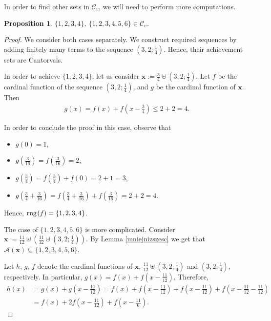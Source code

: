 \documentclass{amsart}
\newtheorem{proposition}[theorem]{Proposition}
\theoremstyle{definition}
\newcommand{\rng}{{\rm rng} \hspace{0.03cm}}
\newcommand{\Cv}{\mathcal{C}_{v}}
\newcommand{\GN}{\mathbf{G}\hspace{-0.07cm}\mathbf{N}}
\begin{document}
In order to find other sets in $\Cv$, we will need to perform more computations.


\begin{proposition}
$\{1,2,3,4\}$, $\{1,2,3,4,5,6\}\in \Cv$.
\end{proposition}
\begin{proof}
We consider both cases separately. We construct required sequences by adding finitely many terms to the sequence $\left(3,2;\frac{1}{4}\right)$. Hence, their achievement sets are Cantorvals.

In order to achieve $\{1,2,3,4\}$, let us consider $\mathbf{x} := \frac{3}{4}\uplus \left(3,2;\frac{1}{4}\right)$. Let $f$ be the cardinal function of the sequence $\left(3,2;\frac{1}{4}\right)$, and $g$ be the cardinal function of $\mathbf{x}$. Then
\begin{align*}
g(x)=f(x)+f\left(x-\frac{3}{4}\right)\leq 2+2=4.
\end{align*}

In order to conclude the proof in this case, observe that
\begin{itemize}
\item $g(0)=1$,
\item $g\left(\frac{3}{16}\right)=f\left(\frac{3}{16}\right)=2$,
\item $g\left(\frac{3}{4}\right)=f\left(\frac{3}{4}\right)+f(0)=2+1=3$,
\item $g\left(\frac{3}{4}+\frac{3}{16}\right)=f\left(\frac{3}{4}+\frac{3}{16}\right)+f\left(\frac{3}{16}\right)=2+2=4$.
\end{itemize}
Hence, $\rng (f)=\{1,2,3,4\}$.


The case of $\{1,2,3,4,5,6\}$ is more complicated. Consider $\mathbf{x}:= \frac{11}{12}\uplus \left(\frac{11}{12}\uplus \left(3,2;\frac{1}{4}\right)\right)$. By Lemma \ref{mniejnizszesc} we get that $\mathcal{A}(\mathbf{x})\subseteq \{1,2,3,4,5,6\}$.

Let $h$, $g$, $f$ denote the cardinal functions of $\mathbf{x}$, $\frac{11}{12}\uplus \left(3,2;\frac{1}{4}\right)$ and $\left(3,2;\frac{1}{4}\right)$, respectively. In particular, $g(x)=f(x)+f\left(x-\frac{11}{12}\right)$. Therefore,
\begin{align*}
h(x) & =g(x)+g\left(x-\frac{11}{12}\right)=f(x)+f\left(x-\frac{11}{12}\right)+f\left(x-\frac{11}{12}\right)+f\left(x-\frac{11}{12}-\frac{11}{12}\right) \\
& =f(x)+2f\left(x-\frac{11}{12}\right)+f\left(x-\frac{11}{6}\right).
\end{align*}


\end{proof}
\end{document}
